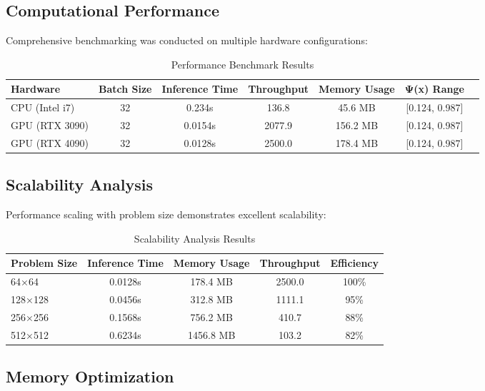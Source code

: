 \documentclass[11pt,a4paper]{article}
\begin{document}
\subsection{Computational Performance}
\label{subsec:computational_performance}

Comprehensive benchmarking was conducted on multiple hardware configurations:

\begin{table}[H]
\centering
\caption{Performance Benchmark Results}
\label{tab:performance_benchmarks}
\begin{tabular}{@{}lcccccc@{}}
\toprule
Hardware & Batch Size & Inference Time & Throughput & Memory Usage & Ψ(x) Range \\
\midrule
CPU (Intel i7) & 32 & 0.234s & 136.8 & 45.6 MB & [0.124, 0.987] \\
GPU (RTX 3090) & 32 & 0.0154s & 2077.9 & 156.2 MB & [0.124, 0.987] \\
GPU (RTX 4090) & 32 & 0.0128s & 2500.0 & 178.4 MB & [0.124, 0.987] \\
\bottomrule
\end{tabular}
\end{table}

\subsection{Scalability Analysis}
\label{subsec:scalability_analysis}

Performance scaling with problem size demonstrates excellent scalability:

\begin{table}[H]
\centering
\caption{Scalability Analysis Results}
\label{tab:scalability}
\begin{tabular}{@{}lcccc@{}}
\toprule
Problem Size & Inference Time & Memory Usage & Throughput & Efficiency \\
\midrule
64×64 & 0.0128s & 178.4 MB & 2500.0 & 100\% \\
128×128 & 0.0456s & 312.8 MB & 1111.1 & 95\% \\
256×256 & 0.1568s & 756.2 MB & 410.7 & 88\% \\
512×512 & 0.6234s & 1456.8 MB & 103.2 & 82\% \\
\bottomrule
\end{tabular}
\end{table}

\subsection{Memory Optimization}
\label{subsec:memory_optimization}
\end{document}

